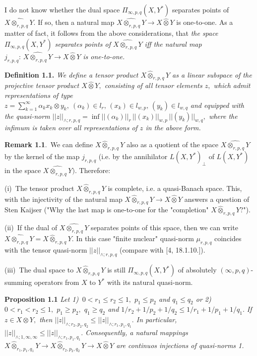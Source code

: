  I do not know whether the dual space $\Pi_{\infty,p,q}(X, Y^*)$ sepa\-ra\-tes
 points of $\widehat{X\otimes_{r,p,q} Y}.$ If so, then a natural map
   $\widehat{X\otimes_{r,p,q} Y}\to X\widehat\otimes Y$ is one-to-one. As a matter of fact,
   it follows from the above considerations, that
 {\it the space $\Pi_{\infty,p,q}(X, Y^*)$ separates
 points of $\widehat{X\otimes_{r,p,q} Y}$ iff the natural map
   $j_{r,p,q}:\, \widehat{X\otimes_{r,p,q} Y}\to X\widehat\otimes Y$ is one-to-one.}
       \smallskip

 \textbf{Definition 1.1.}  {\it
 We define a tensor product $X\widehat\otimes_{r,p,q} Y$ as a linear subspace of
 the projective tensor product $X\widehat\otimes Y,$ consisting of all tensor elements $z,$
 which admit representations of type
 $
  z=\sum_{k=1}^\infty \alpha_k x_k\otimes y_k,\
  (\alpha_k)\in l_r,\, (x_k)\in l_{w,p},\, (y_k)\in l_{w,q}
 $
 and equipped with the quasi-norm $||z||_{\land\!; r,p,q}= \inf ||(\alpha_k)||_r\,
  ||(x_k)||_{w,p}\, ||(y_k)||_{w,q},$ where the infimum is taken over all
  representations of $z$ in the above form.
  }
       \smallskip

 \textbf{Remark 1.1}.\,
  We can define $X\widehat\otimes_{r,p,q} Y$ also as a quotient of the space $\widehat{X\otimes_{r,p,q} Y}$
 by the kernel of the map $j_{r,p,q}$ (i.e. by the annihilator $L(X,Y^*)_{\perp}$ of
$L(X,Y^*)$ in the space $\widehat{X\otimes_{r,p,q} Y}).$ Therefore:

 (i)\,
 The tensor product $X\widehat\otimes_{r,p,q} Y$ is complete, i.e. a quasi-Banach space.
This, with the injectivity of the natural map $X\widehat\otimes_{r,p,q} Y\to X\widehat\otimes Y$
answers a  question of Sten Kaijser ("Why the last map is one-to-one
for the "completion" $X\widehat\otimes_{r,p,q} Y$?").

 (ii)\,
If the dual of $\widehat{X\otimes_{r,p,q} Y}$ separates points of this space,
 then we can write $\widehat{X\otimes_{r,p,q} Y}= X\widehat\otimes_{r,p,q} Y.$ In this case
 "finite nuclear" quasi-norm $\mu_{r,p,q}$ coincides with the tensor quasi-norm
$||z||_{\land\!; r,p,q}$ (compare with [4, 18.1.10.]).

(iii)\,
 The dual space to $X\widehat\otimes_{r,p,q} Y$ is still
 $\Pi_{\infty,p,q}(X,Y^*)$ of absolutely $(\infty,p,q)$-summing operators
from $X$ to $Y^*$ with its natural quasi-norm.
                        \smallskip


\textbf{Proposition 1.1} {\it
Let
1)\,
$0<r_1\le r_2\le1,$ $p_1\le p_2$ and $q_1\le q_2$
or
2)\,
 $0<r_1< r_2\le1,$ $p_1\ge p_2,$ $q_1\ge q_2$ and
 $1/r_2+1/p_2+1/q_2\le 1/r_1+1/p_1+1/q_1.$
If $z\in X\otimes Y,$ then
 $||z||_{\land\!; r_2,p_2,q_2} \le ||z||_{\land\!; r_1,p_1,q_1}.$
In particular,
$||z||_{\land\!; 1,\infty,\infty} \le ||z||_{\land\!; r_1,p_1,q_1}.$
Consequen\-t\-ly, a natural mappings
$X\widehat\otimes_{r_1,p_1,q_1} Y\to X\widehat\otimes_{r_2,p_2,q_2} Y\to X\widehat\otimes Y$ are continuos
injections of quasi-norms 1.
}
                       \smallskip


